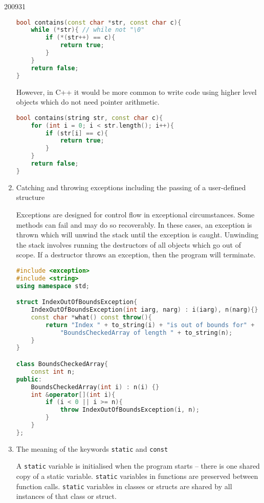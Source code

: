 \documentclass[10pt,\jkfside,a4paper]{article}
\begin{document}
\begin{examquestion}{2009}{3}{1}
\begin{enumerate}[label=(\alph*)]
\begin{lstlisting}[language=C++]
bool contains(const char *str, const char c){
	while (*str){ // while not "\0"
		if (*(str++) == c){
			return true;
		}
	}
	return false;
}
\end{lstlisting}

However, in C++ it would be more common to write code using higher level
objects which do not need pointer arithmetic.

\begin{lstlisting}[language=C++]
bool contains(string str, const char c){
	for (int i = 0; i < str.length(); i++){
		if (str[i] == c){
			return true;
		}
	}
	return false;
}
\end{lstlisting}

\item Catching and throwing exceptions including the passing of a
user-defined structure

Exceptions are designed for control flow in exceptional circumstances. Some
methods can fail and may do so recoverably. In these cases, an exception is
thrown which will unwind the stack until the exception is caught. Unwinding
the stack involves running the destructors of all objects which go out of
scope. If a destructor throws an exception, then the program will terminate.

\begin{lstlisting}[language=C++]
#include <exception>
#include <string>
using namespace std;

struct IndexOutOfBoundsException{
	IndexOutOfBoundsException(int iarg, narg) : i(iarg), n(narg){}
	const char *what() const throw(){
		return "Index " + to_string(i) + "is out of bounds for" +
			"BoundsCheckedArray of length " + to_string(n);
	}
}

class BoundsCheckedArray{
	const int n;
public:
	BoundsCheckedArray(int i) : n(i) {}
	int &operator[](int i){
		if (i < 0 || i >= n){
			throw IndexOutOfBoundsException(i, n);
		}
	}
};

\end{lstlisting}

\item The meaning of the keywords \texttt{static} and \texttt{const}

A \texttt{static} variable is initialised when the program starts -- there
is one shared copy of a static variable. \texttt{static} variables in
functions are preserved between function calls. \texttt{static} variables in
classes or structs are shared by all instances of that class or struct.


\end{enumerate}
\end{examquestion}
\end{document}
